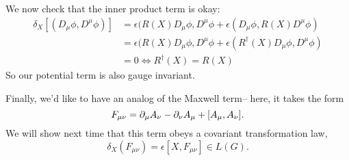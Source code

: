 We now check that the inner product term is okay:
\begin{align*}
\delta_X[(D_\mu \phi,D^\mu \phi)]&=\epsilon(R(X)D_\mu \phi, D^\mu \phi+\epsilon (D_\mu \phi, R(X) D^\mu \phi)\\
&=\epsilon(R(X)D_\mu \phi, D^\mu \phi+\epsilon (R^\dagger(X) D_\mu \phi, D^\mu \phi)\\
&=0\iff R^\dagger(X) = R(X)
\end{align*}
So our potential term is also gauge invariant.

Finally, we'd like to have an analog of the Maxwell term-- here, it takes the form
$$F_{\mu\nu}=\partial_\mu A_\nu -\partial_\nu A_\mu +[A_\mu,A_\nu].$$
We will show next time that this term obeys a covariant transformation law,
$$\delta_X(F_{\mu\nu})=\epsilon[X,F_{\mu\nu}]\in L(G).$$